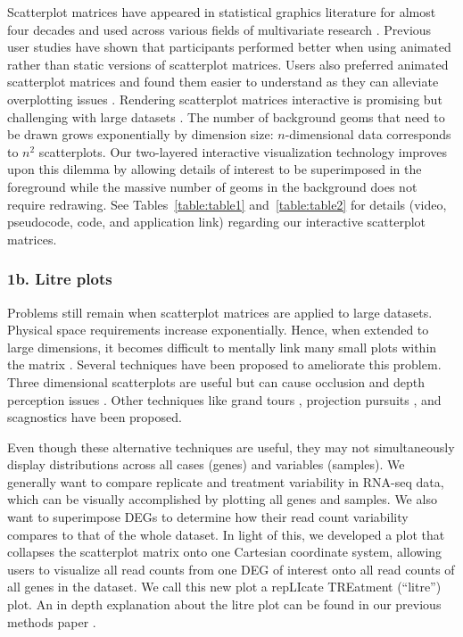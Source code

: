 \documentclass[parskip=full]{bmcart} %
\begin{document}
Scatterplot matrices have appeared in statistical graphics literature for almost four decades and used across various fields of multivariate research \cite{becker1984brushing, carr1984graphical, tufte2001visual, tukey1981graphical}. Previous user studies have shown that participants performed better when using animated rather than static versions of scatterplot matrices. Users also preferred animated scatterplot matrices and found them easier to understand as they can alleviate overplotting issues \cite{chen2018using}. Rendering scatterplot matrices interactive is promising but challenging with large datasets \cite{carr1987scatterplot}. The number of background geoms that need to be drawn grows exponentially by dimension size: $n$-dimensional data corresponds to $n^2$ scatterplots. Our two-layered interactive visualization technology improves upon this dilemma by allowing details of interest to be superimposed in the foreground while the massive number of geoms in the background does not require redrawing. See Tables~\ref{table:table1} and~\ref{table:table2} for details (video, pseudocode, code, and application link) regarding our interactive scatterplot matrices.

\subsubsection*{1b. Litre plots}

Problems still remain when scatterplot matrices are applied to large datasets. Physical space requirements increase exponentially. Hence, when extended to large dimensions, it becomes difficult to mentally link many small plots within the matrix \cite{kerren2007human}. Several techniques have been proposed to ameliorate this problem. Three dimensional scatterplots are useful but can cause occlusion and depth perception issues \cite{kerren2007human}. Other techniques like grand tours \cite{asimov1985grand}, projection pursuits \cite{friedman1974projection, cook1995grand}, and scagnostics \cite{wilkinson2005graph} have been proposed.

Even though these alternative techniques are useful, they may not simultaneously display distributions across all cases (genes) and variables (samples). We generally want to compare replicate and treatment variability in RNA-seq data, which can be visually accomplished by plotting all genes and samples. We also want to superimpose DEGs to determine how their read count variability compares to that of the whole dataset. In light of this, we developed a plot that collapses the scatterplot matrix onto one Cartesian coordinate system, allowing users to visualize all read counts from one DEG of interest onto all read counts of all genes in the dataset. We call this new plot a repLIcate TREatment (``litre'') plot. An in depth explanation about the litre plot can be found in our previous methods paper \cite{rutter1}.
\end{document}

